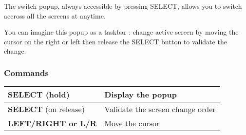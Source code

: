 The switch popup, always accessible by pressing SELECT, allows you to switch accross all the screens at anytime.


You can imagine this popup as a taskbar : change active screen by moving the cursor on the right or left then release the SELECT button to validate the change.

\subsubsection{Commands}
\tablelasttail{\hline}
\begin{supertabular}{|l|l|}
\hline
    {\bf SELECT} (hold) & Display the popup \\
    \hline
    {\bf SELECT} (on release) & Validate the screen change order \\
    \hline
    {\bf LEFT/RIGHT or L/R} & Move the cursor \\
\hline
\end{supertabular}
